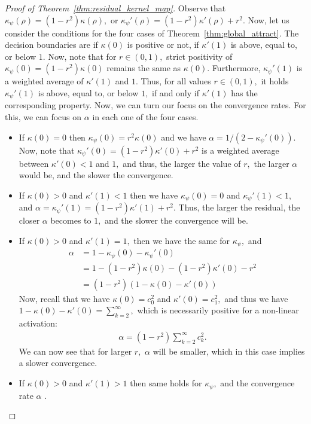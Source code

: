 \documentclass[twoside]{article}
\theoremstyle{definition}
\begin{document}
\begin{proof}[Proof of Theorem~\ref{thm:residual_kernel_map}]
Observe that $\kappa_\psi(\rho) = (1-r^2) \kappa(\rho),$ or $\kappa_\psi'(\rho) = (1-r^2) \kappa'(\rho) + r^2.$ Now, let us consider the conditions for the four cases of Theorem~\ref{thm:global_attract}. The decision boundaries are if $\kappa(0)$ is positive or not, if $\kappa'(1)$ is above, equal to, or below $1.$ Now, note that for $r \in (0,1),$ strict positivity of $\kappa_\psi(0) = (1-r^2) \kappa(0)$ remains the same as $\kappa(0).$ Furthermore, $\kappa_\psi'(1)$ is a weighted average of $\kappa'(1)$ and $1.$ Thus, for all values $r\in(0,1),$ it holds $\kappa_\psi'(1)$ is above, equal to, or below $1,$ if and only if $\kappa'(1)$ has the corresponding property.  Now, we can turn our focus on the convergence rates. For this, we can focus on $\alpha$ in each one of the four cases. 
\begin{itemize}
    \item If $\kappa(0)=0$ then $\kappa_\psi(0) = r^2 \kappa(0)$ and we have $\alpha = 1 / (2-\kappa_\psi'(0)).$ Now, note that $\kappa_\psi'(0) = (1-r^2)\kappa'(0) +  r^2$ is a weighted average between $\kappa'(0) < 1$ and $1,$ and thus, the larger the value of $r,$ the larger $\alpha$ would be, and the slower the convergence. 
    \item If $\kappa(0)>0$ and $\kappa'(1)<1$ then we have $\kappa_\psi(0)=0$ and $\kappa_\psi'(1) < 1,$ and $\alpha = \kappa_\psi'(1) = (1-r^2) \kappa'(1) + r^2.$ Thus, the larger the residual, the closer $\alpha$ becomes to $1,$ and the slower the convergence will be.  
    \item If $\kappa(0)>0$ and $\kappa'(1)=1,$ then we have the same for $\kappa_\psi,$ and 
    \begin{align*}
        \alpha &= 1 - \kappa_\psi(0) - \kappa_\psi'(0)\\
        &= 1 - (1-r^2) \kappa(0) - (1-r^2)\kappa'(0) - r^2\\
        &= (1-r^2 )( 1 - \kappa(0) - \kappa'(0))
    \end{align*}
    Now, recall that we have $\kappa(0) = c_0^2$ and $\kappa'(0)=c_1^2,$ and thus we have $1-\kappa(0) - \kappa'(0) = \sum_{k=2}^\infty,$ which is necessarily positive for a non-linear activation:
    \begin{align*}
        \alpha = (1-r^2) \sum_{k=2}^\infty c_k^2.
    \end{align*}
    We can now see that for larger $r,$ $\alpha $ will be smaller, which in this case implies a slower convergence. 
    \item If $\kappa(0)>0$ and $\kappa'(1) > 1$ then same holds for $\kappa_\psi,$ and the convergence rate $\alpha$ .
\end{itemize}

\end{proof}
\end{document}
